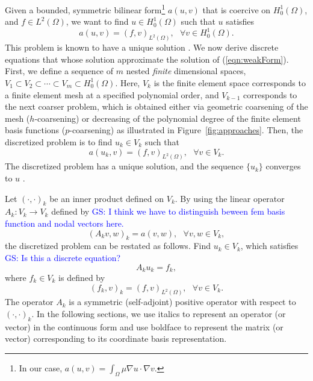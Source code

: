 \documentclass[smallcondensed,final]{svjour3}     %
\newcommand{\gsnote}[1]{\textcolor{blue}{GS: #1}}
\begin{document}
Given a bounded, symmetric bilinear form\footnote{In our case,
  $a(u,v)=\int_\Omega \mu\nabla u \cdot \nabla v$.} $a(u,v)$ that is
coercive
on $H_0^{1}(\Omega)$, and $f \in L^{2}(\Omega)$, we want to find $u
\in H_0^{1}(\Omega)$ such that $u$ satisfies
\begin{equation}
\label{eqn:weakForm}
a(u,v) = (f,v)_{L^2(\Omega)}, \ \ \ \forall v \in H_0^{1}(\Omega).
\end{equation}
This problem is known to have a unique solution \cite{BrennerScott94}. 
%
We now derive discrete equations that whose solution 
approximate the solution of
(\ref{eqn:weakForm}). First, we define a sequence of $m$ nested {\em finite}
dimensional spaces, $V_1 \subset V_2 \subset \cdots \subset V_m \subset
H_0^{1}(\Omega)$.
Here, $V_k$ is the finite element space corresponds to a finite element mesh
at a specified
polynomial order, and $V_{k-1}$ corresponds to the next coarser
problem, which is obtained either via geometric coarsening of the
mesh ($h$-coarsening) or decreasing of the polynomial degree of the
finite element basis functions ($p$-coarsening) as illustrated in
Figure~\ref{fig:approaches}.  Then, the discretized problem is to find
$u_k \in V_k$ such that
\begin{equation*}
a(u_{k},v) = (f,v)_{L^2(\Omega)}, \ \ \ \forall v \in V_k.
\end{equation*}
The discretized problem has a unique solution, and the sequence
$\{u_k\}$ converges to $u$ \cite{BrennerScott94}.

Let $(\cdot,\cdot)_{k}$ be an inner product defined on $V_k$. By using
the linear operator $A_k : V_{k} \rightarrow V_{k} $ defined by
\gsnote{I think we have to distinguish beween fem basis function and
  nodal vectors here.}
\begin{equation*}
(A_{k} v,w)_k = a(v,w),  \ \ \ \forall v,w \in V_k,
\end{equation*}
the discretized problem can be restated as follows. 
Find $u_k \in V_k$, which satisfies \gsnote{Is this a discrete equation?}
\begin{equation}
\label{eqn:discreteFE}
A_k u_k = f_k,
\end{equation}
where $f_k \in V_k $ is defined by
\begin{equation}
(f_k,v)_k = (f,v)_{L^2(\Omega)},  \ \ \ \forall v \in V_k.  
\end{equation}
The operator $A_k$ is a symmetric (self-adjoint) positive operator
with respect to $(\cdot,\cdot)_k$. In the following sections, we use italics to
represent an operator (or vector) in the continuous form and use boldface to represent the matrix (or vector) corresponding to its
coordinate basis representation.
\end{document}
